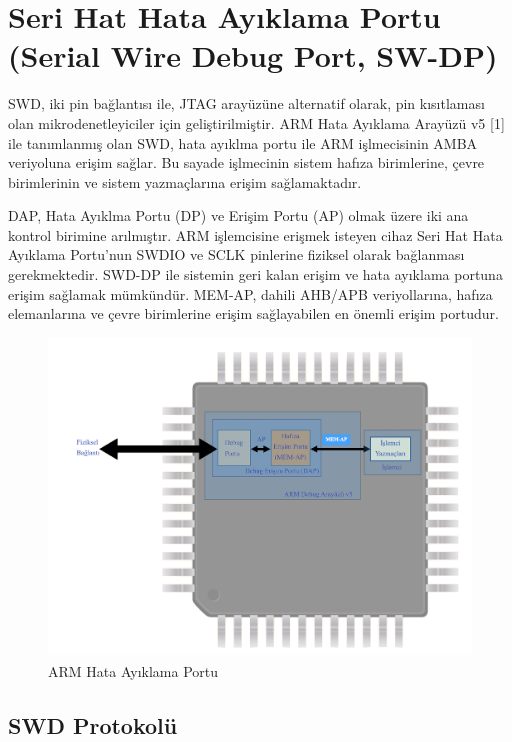 \chapter{Seri Hat Hata Ayıklama Portu (Serial Wire Debug Port, SW-DP)}

\acrfull{SWD}, iki pin bağlantısı ile, JTAG arayüzüne alternatif olarak, pin kısıtlaması olan mikrodenetleyiciler için geliştirilmiştir.
ARM Hata Ayıklama Arayüzü v5 [1] ile tanımlanmış olan SWD, hata ayıklma portu ile ARM işlmecisinin \acrshort{AMBA} veriyoluna erişim sağlar. Bu sayade
işlmecinin sistem hafıza birimlerine, çevre birimlerinin ve sistem yazmaçlarına erişim sağlamaktadır.

\acrfull{DAP}, Hata Ayıklma Portu (\acrshort{DP}) ve Erişim Portu (\acrshort{AP}) olmak üzere iki ana kontrol birimine arılmıştır. ARM işlemcisine erişmek isteyen cihaz
Seri Hat Hata Ayıklama Portu'nun SWDIO ve SCLK pinlerine fiziksel olarak bağlanması gerekmektedir. SWD-DP ile sistemin geri kalan erişim ve hata ayıklama portuna erişim
sağlamak mümkündür. \acrfull{MEM-AP}, dahili AHB/APB veriyollarına, hafıza elemanlarına ve çevre birimlerine erişim sağlayabilen en önemli erişim portudur.

\begin{figure}[h]
\centering
\includegraphics[width=\textwidth]{gorseller/memAp}
\caption{ARM Hata Ayıklama Portu}\label{fig:memAp}
\end{figure}

\section{SWD Protokolü}

